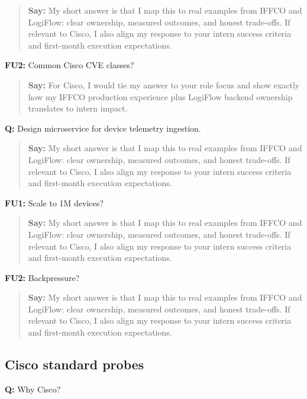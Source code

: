 \documentclass[9pt,a4paper]{article}
\begin{document}
\begin{quote}\small\textbf{Say:} My short answer is that I map this to real examples from IFFCO and LogiFlow: clear ownership, measured outcomes, and honest trade-offs. If relevant to Cisco, I also align my response to your intern success criteria and first-month execution expectations.\end{quote}
\vspace{2mm}
\textbf{FU2:} Common Cisco CVE classes?

\begin{quote}\small\textbf{Say:} For Cisco, I would tie my answer to your role focus and show exactly how my IFFCO production experience plus LogiFlow backend ownership translates to intern impact.\end{quote}
\vspace{2mm}
\textbf{Q:} Design microservice for device telemetry ingestion.

\begin{quote}\small\textbf{Say:} My short answer is that I map this to real examples from IFFCO and LogiFlow: clear ownership, measured outcomes, and honest trade-offs. If relevant to Cisco, I also align my response to your intern success criteria and first-month execution expectations.\end{quote}
\vspace{2mm}
\textbf{FU1:} Scale to 1M devices?

\begin{quote}\small\textbf{Say:} My short answer is that I map this to real examples from IFFCO and LogiFlow: clear ownership, measured outcomes, and honest trade-offs. If relevant to Cisco, I also align my response to your intern success criteria and first-month execution expectations.\end{quote}
\vspace{2mm}
\textbf{FU2:} Backpressure?

\begin{quote}\small\textbf{Say:} My short answer is that I map this to real examples from IFFCO and LogiFlow: clear ownership, measured outcomes, and honest trade-offs. If relevant to Cisco, I also align my response to your intern success criteria and first-month execution expectations.\end{quote}
\vspace{2mm}
\subsection{Cisco standard probes}
\textbf{Q:} Why Cisco?
\end{document}
